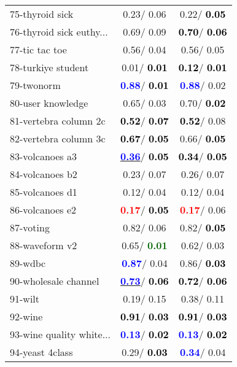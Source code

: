 \begin{table}[h]
\begin{center}
\begin{tabular}{lc|c}
75-thyroid sick &   0.23/  0.06 &   0.22/\textcolor{black}{\textbf{  0.05}} \\
76-thyroid sick euthy... &   0.69/  0.09 & \textcolor{black}{\textbf{  0.70}}/\textcolor{black}{\textbf{  0.06}} \\
77-tic tac toe &   0.56/  0.04 &   0.56/  0.05 \\
78-turkiye student &   0.01/\textcolor{black}{\textbf{  0.01}} & \textcolor{black}{\textbf{  0.12}}/\textcolor{black}{\textbf{  0.01}} \\ \hline
79-twonorm & \textcolor{blue}{\textbf{  0.88}}/\textcolor{black}{\textbf{  0.01}} & \textcolor{blue}{\textbf{  0.88}}/  0.02 \\
80-user knowledge &   0.65/  0.03 &   0.70/\textcolor{black}{\textbf{  0.02}} \\
81-vertebra column 2c & \textcolor{black}{\textbf{  0.52}}/\textcolor{black}{\textbf{  0.07}} & \textcolor{black}{\textbf{  0.52}}/  0.08 \\
82-vertebra column 3c & \textcolor{black}{\textbf{  0.67}}/\textcolor{black}{\textbf{  0.05}} &   0.66/\textcolor{black}{\textbf{  0.05}} \\
83-volcanoes a3 & \underline{\textcolor{blue}{\textbf{  0.36}}}/\textcolor{black}{\textbf{  0.05}} & \textcolor{black}{\textbf{  0.34}}/\textcolor{black}{\textbf{  0.05}} \\
84-volcanoes b2 &   0.23/  0.07 &   0.26/  0.07 \\
85-volcanoes d1 &   0.12/  0.04 &   0.12/  0.04 \\ \hline
86-volcanoes e2 & \textcolor{red}{\textbf{  0.17}}/\textcolor{black}{\textbf{  0.05}} & \textcolor{red}{\textbf{  0.17}}/  0.06 \\
87-voting &   0.82/  0.06 &   0.82/\textcolor{black}{\textbf{  0.05}} \\
88-waveform v2 &   0.65/\textcolor{darkgreen}{\textbf{  0.01}} &   0.62/  0.03 \\
89-wdbc & \textcolor{blue}{\textbf{  0.87}}/  0.04 &   0.86/\textcolor{black}{\textbf{  0.03}} \\
90-wholesale channel & \underline{\textcolor{blue}{\textbf{  0.73}}}/\textcolor{black}{\textbf{  0.06}} & \textcolor{black}{\textbf{  0.72}}/\textcolor{black}{\textbf{  0.06}} \\
91-wilt &   0.19/  0.15 &   0.38/  0.11 \\
92-wine & \textcolor{black}{\textbf{  0.91}}/\textcolor{black}{\textbf{  0.03}} & \textcolor{black}{\textbf{  0.91}}/\textcolor{black}{\textbf{  0.03}} \\ \hline
93-wine quality white... & \textcolor{blue}{\textbf{  0.13}}/\textcolor{black}{\textbf{  0.02}} & \textcolor{blue}{\textbf{  0.13}}/\textcolor{black}{\textbf{  0.02}} \\
94-yeast 4class &   0.29/\textcolor{black}{\textbf{  0.03}} & \textcolor{blue}{\textbf{  0.34}}/  0.04 \\\end{tabular}\label{stratsALCKappa2bestReduxb}
\end{center}
\end{table}